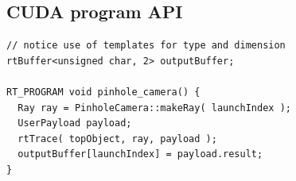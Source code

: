 \subsection{CUDA program API}

\begin{lstlisting}
// notice use of templates for type and dimension
rtBuffer<unsigned char, 2> outputBuffer; 

RT_PROGRAM void pinhole_camera() {
  Ray ray = PinholeCamera::makeRay( launchIndex );
  UserPayload payload;
  rtTrace( topObject, ray, payload );
  outputBuffer[launchIndex] = payload.result;
}
\end{lstlisting}
